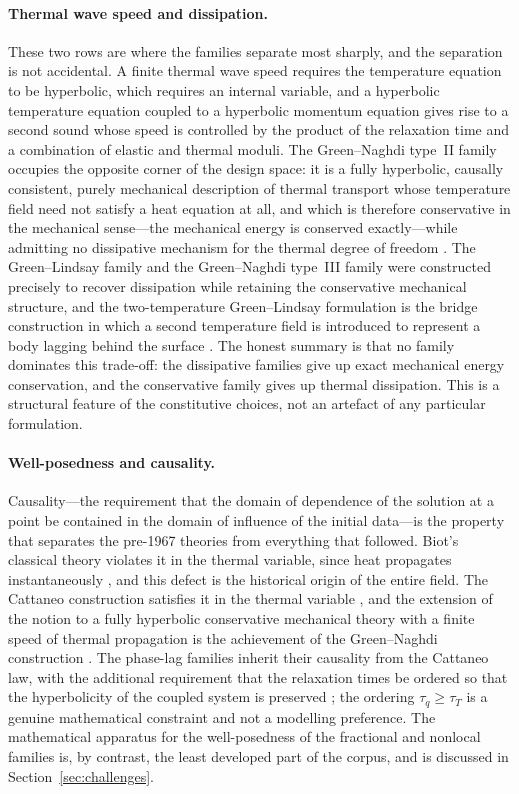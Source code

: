 \paragraph{Thermal wave speed and dissipation.}
These two rows are where the families separate most sharply, and the separation is not accidental. A finite thermal wave speed requires the temperature equation to be hyperbolic, which requires an internal variable, and a hyperbolic temperature equation coupled to a hyperbolic momentum equation gives rise to a second sound whose speed is controlled by the product of the relaxation time and a combination of elastic and thermal moduli. The Green--Naghdi type~II family occupies the opposite corner of the design space: it is a fully hyperbolic, causally consistent, purely mechanical description of thermal transport whose temperature field need not satisfy a heat equation at all, and which is therefore conservative in the mechanical sense---the mechanical energy is conserved exactly---while admitting no dissipative mechanism for the thermal degree of freedom \cite{Green1991}. The Green--Lindsay family and the Green--Naghdi type~III family were constructed precisely to recover dissipation while retaining the conservative mechanical structure, and the two-temperature Green--Lindsay formulation is the bridge construction in which a second temperature field is introduced to represent a body lagging behind the surface \cite{Green1972,Green1993}. The honest summary is that no family dominates this trade-off: the dissipative families give up exact mechanical energy conservation, and the conservative family gives up thermal dissipation. This is a structural feature of the constitutive choices, not an artefact of any particular formulation.

\paragraph{Well-posedness and causality.}
Causality---the requirement that the domain of dependence of the solution at a point be contained in the domain of influence of the initial data---is the property that separates the pre-1967 theories from everything that followed. Biot's classical theory violates it in the thermal variable, since heat propagates instantaneously \cite{Biot1956}, and this defect is the historical origin of the entire field. The Cattaneo construction satisfies it in the thermal variable \cite{Cattaneo1948}, and the extension of the notion to a fully hyperbolic conservative mechanical theory with a finite speed of thermal propagation is the achievement of the Green--Naghdi construction \cite{Green1991}. The phase-lag families inherit their causality from the Cattaneo law, with the additional requirement that the relaxation times be ordered so that the hyperbolicity of the coupled system is preserved \cite{Tzou1995,Tzou1997}; the ordering $\tau_q \geq \tau_T$ is a genuine mathematical constraint and not a modelling preference. The mathematical apparatus for the well-posedness of the fractional and nonlocal families is, by contrast, the least developed part of the corpus, and is discussed in Section~\ref{sec:challenges}.

